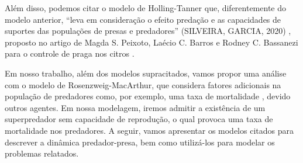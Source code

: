 Além disso, podemos citar o modelo de Holling-Tanner que, diferentemente do modelo anterior, ``leva em consideração o efeito predação e as capacidades de suportes das populações de presas e predadores'' (SILVEIRA, GARCIA, 2020) \cite{gs_rg_2020}, proposto no artigo de Magda S. Peixoto, Laécio C. Barros e Rodney C. Bassanezi para o controle de praga nos citros \cite{mp_lb_rb_2005}. 

Em nosso trabalho, além dos modelos supracitados, vamos propor uma análise com o modelo de Rosenzweig-MacArthur, que considera fatores adicionais na população de predadores como, por exemplo, uma taxa de mortalidade \cite{id_mg_r_2021}, devido outros agentes. Em nossa modelagem, iremos admitir a existência de um superpredador sem capacidade de reprodução, o qual provoca uma taxa de mortalidade nos predadores. A seguir, vamos apresentar os modelos citados para descrever a dinâmica predador-presa, bem como utilizá-los para modelar os problemas relatados.
